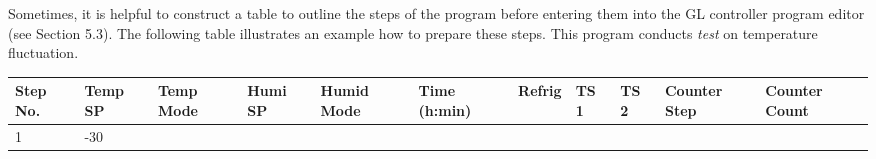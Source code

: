 Sometimes, it is helpful to construct a table to outline the steps of
the program before entering them into the GL controller program editor
(see Section 5.3). The following table illustrates an example how to
prepare these steps. This program conducts \emph{test} on temperature
fluctuation.

\begin{longtable}[]{@{}lllllllllll@{}}
\toprule
\begin{minipage}[b]{0.09\columnwidth}\raggedright
Step No.\strut
\end{minipage} & \begin{minipage}[b]{0.05\columnwidth}\raggedright
Temp SP\strut
\end{minipage} & \begin{minipage}[b]{0.09\columnwidth}\raggedright
Temp Mode\strut
\end{minipage} & \begin{minipage}[b]{0.06\columnwidth}\raggedright
Humi SP\strut
\end{minipage} & \begin{minipage}[b]{0.06\columnwidth}\raggedright
Humid Mode\strut
\end{minipage} & \begin{minipage}[b]{0.12\columnwidth}\raggedright
Time (h:min)\strut
\end{minipage} & \begin{minipage}[b]{0.08\columnwidth}\raggedright
Refrig\strut
\end{minipage} & \begin{minipage}[b]{0.04\columnwidth}\raggedright
TS 1\strut
\end{minipage} & \begin{minipage}[b]{0.05\columnwidth}\raggedright
TS 2\strut
\end{minipage} & \begin{minipage}[b]{0.03\columnwidth}\raggedright
Counter Step\strut
\end{minipage} & \begin{minipage}[b]{0.03\columnwidth}\raggedright
Counter Count\strut
\end{minipage}\tabularnewline
\midrule
\endhead
\begin{minipage}[t]{0.09\columnwidth}\raggedright
1\strut
\end{minipage} & \begin{minipage}[t]{0.05\columnwidth}\raggedright
-30\strut
\end{minipage} & \begin{minipage}[t]{0.09\columnwidth}\raggedright

\end{minipage}
\end{longtable}
